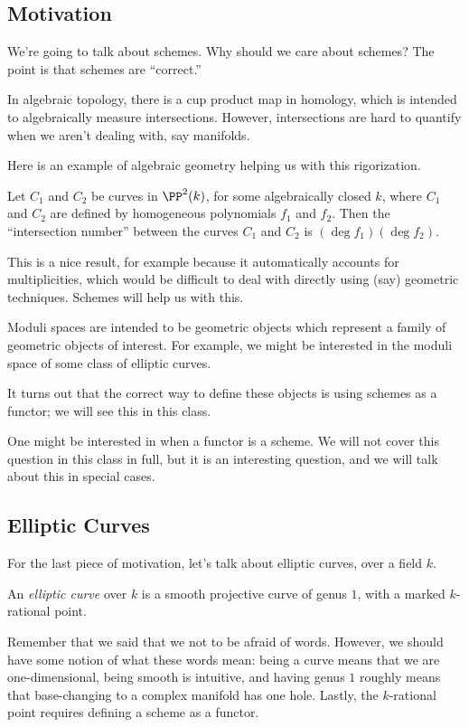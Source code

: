 \documentclass[../notes.tex]{subfiles}
\begin{document}
\subsection{Motivation}
We're going to talk about schemes. Why should we care about schemes? The point is that schemes are ``correct.''
\begin{example}
	In algebraic topology, there is a cup product map in homology, which is intended to algebraically measure intersections. However, intersections are hard to quantify when we aren't dealing with, say manifolds.
\end{example}
Here is an example of algebraic geometry helping us with this rigorization.
\begin{theorem}[B\'ezout]
	Let $C_1$ and $C_2$ be curves in $\PP^2(k)$, for some algebraically closed $k$, where $C_1$ and $C_2$ are defined by homogeneous polynomials $f_1$ and $f_2$. Then the ``intersection number'' between the curves $C_1$ and $C_2$ is $(\deg f_1)(\deg f_2)$.
\end{theorem}
This is a nice result, for example because it automatically accounts for multiplicities, which would be difficult to deal with directly using (say) geometric techniques. Schemes will help us with this.
\begin{example}
	Moduli spaces are intended to be geometric objects which represent a family of geometric objects of interest. For example, we might be interested in the moduli space of some class of elliptic curves.
\end{example}
It turns out that the correct way to define these objects is using schemes as a functor; we will see this in this class.
\begin{remark}
	One might be interested in when a functor is a scheme. We will not cover this question in this class in full, but it is an interesting question, and we will talk about this in special cases. 
\end{remark}

\subsection{Elliptic Curves}
For the last piece of motivation, let's talk about elliptic curves, over a field $k$.
\begin{definition}
	An \textit{elliptic curve} over $k$ is a smooth projective curve of genus $1$, with a marked $k$-rational point.
\end{definition}
Remember that we said that we not to be afraid of words. However, we should have some notion of what these words mean: being a curve means that we are one-dimensional, being smooth is intuitive, and having genus $1$ roughly means that base-changing to a complex manifold has one hole. Lastly, the $k$-rational point requires defining a scheme as a functor.
\end{document}

